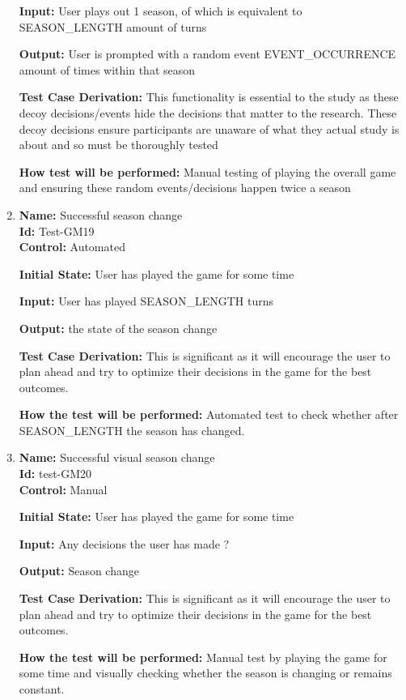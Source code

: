 \documentclass[12pt, titlepage]{article}
\begin{document}
\begin{enumerate}
\textbf{Input:} User plays out 1 season, of which is equivalent to SEASON\_LENGTH amount of turns
					
\textbf{Output:} User is prompted with a random event EVENT\_OCCURRENCE amount of times within that season

\textbf{Test Case Derivation:} This functionality is essential to the study as these decoy decisions/events hide the decisions that matter to the research. These decoy decisions ensure participants are unaware of what they actual study is about and so must be thoroughly tested

\textbf{How test will be performed:} Manual testing of playing the overall game and ensuring these random events/decisions happen twice a season

\item{\textbf{Name:} Successful season change\\} %
\textbf{Id:} Test-GM19 \label{Test-GM19}\\

\textbf{Control:} Automated

\textbf{Initial State:} User has played the game for some time

\textbf{Input:} User has played SEASON\_LENGTH turns

\textbf{Output:} the state of the season change

\textbf{Test Case Derivation:} This is significant as it will encourage the user to plan ahead and try to optimize their decisions in the game for the best outcomes.

\textbf{How the test will be performed:} Automated test to check whether after SEASON\_LENGTH the season has changed.

\item{\textbf{Name: }Successful visual season change\\} %
\textbf{Id:} test-GM20 \label{Test-GM20}\\

\textbf{Control:} Manual

\textbf{Initial State:} User has played the game for some time

\textbf{Input:} Any decisions the user has made ?

\textbf{Output:} Season change

\textbf{Test Case Derivation: }This is significant as it will encourage the user to plan ahead and try to optimize their decisions in the game for the best outcomes.

\textbf{How the test will be performed:} Manual test by playing the game for some time and visually checking whether the season is changing or remains constant.


\end{enumerate}
\end{document}
